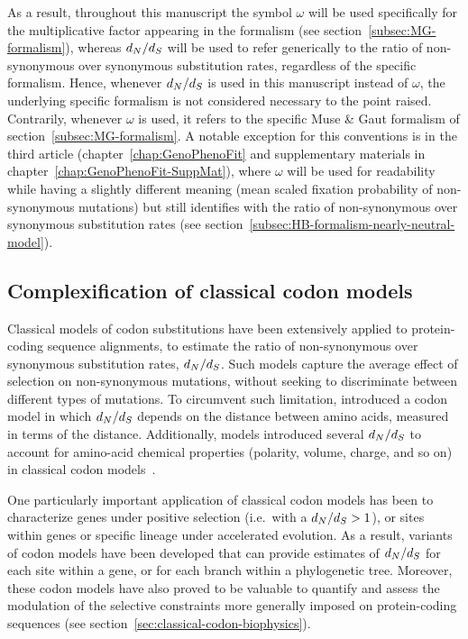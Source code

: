 As a result, throughout this manuscript the symbol $\omega$ will be used specifically for the multiplicative factor appearing in the \citet{Muse1994} formalism (see section~\ref{subsec:MG-formalism}), whereas $d_N / d_S$ will be used to refer generically to the ratio of non-synonymous over synonymous substitution rates, regardless of the specific formalism.
Hence, whenever $d_N / d_S$ is used in this manuscript instead of $\omega$, the underlying specific formalism is not considered necessary to the point raised.
Contrarily, whenever $\omega$ is used, it refers to the specific Muse \& Gaut formalism of section~\ref{subsec:MG-formalism}.
A notable exception for this conventions is in the third article (chapter~\ref{chap:GenoPhenoFit} and supplementary materials in chapter~\ref{chap:GenoPhenoFit-SuppMat}), where $\omega$ will be used for readability while having a slightly different meaning (mean scaled fixation probability of non-synonymous mutations) but still identifies with the ratio of non-synonymous over synonymous substitution rates (see section~\ref{subsec:HB-formalism-nearly-neutral-model}).

\subsection{Complexification of classical codon models}
\label{subsec:classical-codon-models-complexification}

Classical models of codon substitutions have been extensively applied to protein-coding sequence alignments, to estimate the ratio of non-synonymous over synonymous substitution rates, $d_N / d_S$.
Such models capture the average effect of selection on non-synonymous mutations, without seeking to discriminate between different types of mutations.
To circumvent such limitation, \citet{Yang1998a} introduced a codon model in which $d_N / d_S$ depends on the distance between amino acids, measured in terms of the \citet{Grantham1974} distance.
Additionally, models introduced several $d_N / d_S$ to account for amino-acid chemical properties (polarity, volume, charge, and so on) in classical codon models~\citep{Dutheil2008}.

One particularly important application of classical codon models has been to characterize genes under positive selection (i.e.~with a $d_N / d_S > 1$), or sites within genes or specific lineage under accelerated evolution.
As a result, variants of codon models have been developed that can provide estimates of $d_N / d_S$ for each site within a gene, or for each branch within a phylogenetic tree.
Moreover, these codon models have also proved to be valuable to quantify and assess the modulation of the selective constraints more generally imposed on protein-coding sequences (see section~\ref{sec:classical-codon-biophysics}).

